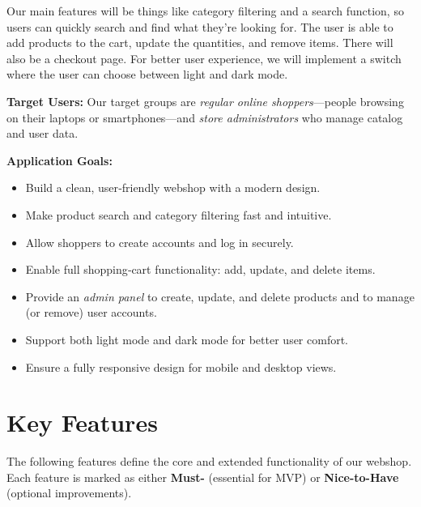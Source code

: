 \documentclass[12pt]{article}
\begin{document}
Our main features will be things like category filtering and a search function, so users can quickly search and find what they're looking for.
The user is able to add products to the cart, update the quantities, and remove items.
There will also be a checkout page.
For better user experience, we will implement a switch where the user can choose between light and dark mode.

\textbf{Target Users:}
Our target groups are \emph{regular online shoppers}—people browsing on their laptops or smartphones—and \emph{store administrators} who manage catalog and user data.

\textbf{Application Goals:}
\begin{itemize}
	\item Build a clean, user‑friendly webshop with a modern design.
	\item Make product search and category filtering fast and intuitive.
	\item Allow shoppers to create accounts and log in securely.
	\item Enable full shopping‑cart functionality: add, update, and delete items.
	\item Provide an \emph{admin panel} to create, update, and delete products and to manage (or remove) user accounts.
	\item Support both light mode and dark mode for better user comfort.
	\item Ensure a fully responsive design for mobile and desktop views.
\end{itemize}

\section{Key Features}\label{sec:key-features}

The following features define the core and extended functionality of our webshop.
Each feature is marked as either \textbf{Must-} (essential for MVP) or \textbf{Nice-to-Have} (optional improvements).
\end{document}
